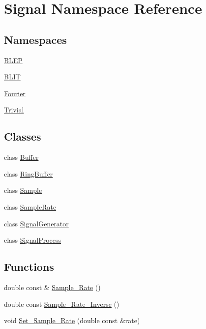 \hypertarget{namespaceSignal}{\section{Signal Namespace Reference}
\label{namespaceSignal}
}
\subsection*{Namespaces}
\begin{DoxyCompactItemize}
\item 
 \hyperlink{namespaceSignal_1_1BLEP}{B\+L\+E\+P}
\item 
 \hyperlink{namespaceSignal_1_1BLIT}{B\+L\+I\+T}
\item 
 \hyperlink{namespaceSignal_1_1Fourier}{Fourier}
\item 
 \hyperlink{namespaceSignal_1_1Trivial}{Trivial}
\end{DoxyCompactItemize}
\subsection*{Classes}
\begin{DoxyCompactItemize}
\item 
class \hyperlink{classSignal_1_1Buffer}{Buffer}
\item 
class \hyperlink{classSignal_1_1RingBuffer}{Ring\+Buffer}
\item 
class \hyperlink{classSignal_1_1Sample}{Sample}
\item 
class \hyperlink{classSignal_1_1SampleRate}{Sample\+Rate}
\item 
class \hyperlink{classSignal_1_1SignalGenerator}{Signal\+Generator}
\item 
class \hyperlink{classSignal_1_1SignalProcess}{Signal\+Process}
\end{DoxyCompactItemize}
\subsection*{Functions}
\begin{DoxyCompactItemize}
\item 
double const \& \hyperlink{namespaceSignal_ae7b1f222afc010e0f33f306f978fcde9}{Sample\+\_\+\+Rate} ()
\item 
double const \hyperlink{namespaceSignal_ae7e8bbfcac6571aaaf18d7f96f3fefc3}{Sample\+\_\+\+Rate\+\_\+\+Inverse} ()
\item 
void \hyperlink{namespaceSignal_a2f163a7bbf1b0fc76ceba8b0916a7890}{Set\+\_\+\+Sample\+\_\+\+Rate} (double const \&rate)
\end{DoxyCompactItemize}


